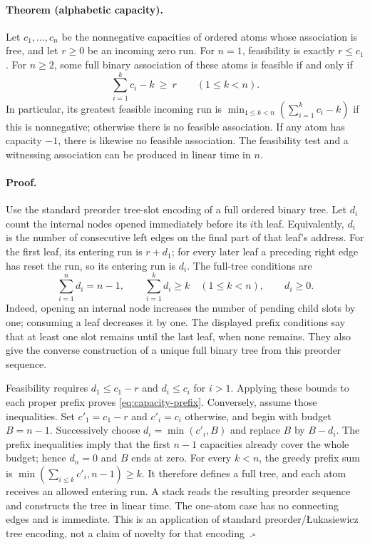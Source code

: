 \paragraph{Theorem (alphabetic capacity).}
Let $c_1,\ldots,c_n$ be the nonnegative capacities of ordered atoms whose
association is free, and let $r\ge0$ be an incoming zero run.  For $n=1$,
feasibility is exactly $r\le c_1$.  For $n\ge2$, some full binary association
of these atoms is feasible if and only if
\begin{equation}
 \sum_{i=1}^{k}c_i-k\ \ge\ r
 \qquad(1\le k<n).
 \label{eq:capacity-prefix}
\end{equation}
In particular, its greatest feasible incoming run is
$\min_{1\le k<n}(\sum_{i=1}^{k}c_i-k)$ if this is nonnegative; otherwise there
is no feasible association.  If any atom has capacity $-1$, there is likewise
no feasible association.  The feasibility test and a witnessing association
can be produced in linear time in $n$.

\paragraph{Proof.}
Use the standard preorder tree-slot encoding of a full ordered binary tree.
Let $d_i$ count the internal nodes opened immediately before its $i$th leaf.
Equivalently, $d_i$ is the number of consecutive left edges on the final
part of that leaf's address.  For the first leaf, its entering run is
$r+d_1$; for every later leaf a preceding right edge has reset the run, so
its entering run is $d_i$.  The full-tree conditions are
\[
 \sum_{i=1}^{n}d_i=n-1,
 \qquad \sum_{i=1}^{k}d_i\ge k\quad(1\le k<n),
 \qquad d_i\ge0.
\]
Indeed, opening an internal node increases the number of pending child
slots by one; consuming a leaf decreases it by one.  The displayed prefix
conditions say that at least one slot remains until the last leaf, when
none remains.  They also give the converse construction of a unique full
binary tree from this preorder sequence.

Feasibility requires $d_1\le c_1-r$ and $d_i\le c_i$ for $i>1$.
Applying these bounds to each proper prefix proves
\eqref{eq:capacity-prefix}.  Conversely, assume those inequalities.  Set
$c'_1=c_1-r$ and $c'_i=c_i$ otherwise, and begin with budget $B=n-1$.
Successively choose $d_i=\min(c'_i,B)$ and replace $B$ by $B-d_i$.
The prefix inequalities imply that the first $n-1$ capacities already
cover the whole budget; hence $d_n=0$ and $B$ ends at zero.  For every
$k<n$, the greedy prefix sum is
$\min(\sum_{i\le k}c'_i,n-1)\ge k$.  It therefore defines a full tree,
and each atom receives an allowed entering run.  A stack reads the resulting
preorder sequence and constructs the tree in linear time.  The one-atom
case has no connecting edges and is immediate.  This is an application of
standard preorder/\L ukasiewicz tree encoding, not a claim of novelty for
that encoding~\cite{lukasiewicz}.\hfill$\square$

